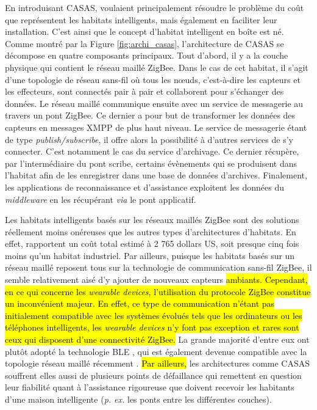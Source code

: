 En introduisant CASAS, \cite{Cook2013} voulaient principalement résoudre le problème du coût que représentent les habitats intelligents, mais également en faciliter leur installation. C'est ainsi que le concept d'habitat intelligent en boîte est né. Comme montré par la Figure \ref{fig:archi_casas}, l'architecture de CASAS se décompose en quatre composants principaux. Tout d'abord, il y a la couche physique qui contient le réseau maillé ZigBee. Dans le cas de cet habitat, il s'agit d'une topologie de réseau sans-fil où tous les n\oe{}uds, c'est-à-dire les capteurs et les effecteurs, sont connectés pair à pair et collaborent pour s'échanger des données. Le réseau maillé communique ensuite avec un service de messagerie au travers un pont ZigBee. Ce dernier a pour but de transformer les données des capteurs en messages \ac{XMPP} de plus haut niveau. Le service de messagerie étant de type \textit{publish/subscribe}, il offre alors la possibilité à d'autres services de s'y connecter. C'est notamment le cas du service d'archivage. Ce dernier récupère, par l'intermédiaire du pont scribe, certains évènements qui se produisent dans l'habitat afin de les enregistrer dans une base de données d'archives. Finalement, les applications de reconnaissance et d'assistance exploitent les données du \textit{middleware} en les récupérant \textit{via} le pont applicatif.

Les habitats intelligents basés sur les réseaux maillés ZigBee sont des solutions réellement moins onéreuses que les autres types d'architectures d'habitats. En effet, \cite{Cook2013} rapportent un coût total estimé à 2 765 dollars US, soit presque cinq fois moins qu'un habitat industriel. Par ailleurs, puisque les habitats basés sur un réseau maillé reposent tous sur la technologie de communication sans-fil ZigBee, il semble relativement aisé d'y ajouter de nouveaux capteurs \hl{ambiants. Cependant, en ce qui concerne les \textit{wearable devices}, l'utilisation du protocole ZigBee constitue un inconvénient majeur. En effet, ce type de communication n'étant pas initialement compatible avec les systèmes évolués tels que les ordinateurs ou les téléphones intelligents, les \textit{wearable devices} n'y font pas exception et rares sont ceux qui disposent d'une connectivité ZigBee.} La grande majorité d'entre eux ont plutôt adopté la technologie \ac{BLE} \citep{Martin2014}, qui est également devenue compatible avec la topologie réseau maillé récemment \citep{Bluetooth2017}. \hl{Par ailleurs,} les architectures comme CASAS souffrent elles aussi de plusieurs points de défaillance qui remettent en question leur fiabilité quant à l'assistance rigoureuse que doivent recevoir les habitants d'une maison intelligente (\textit{p. ex.} les ponts entre les différentes couches).


